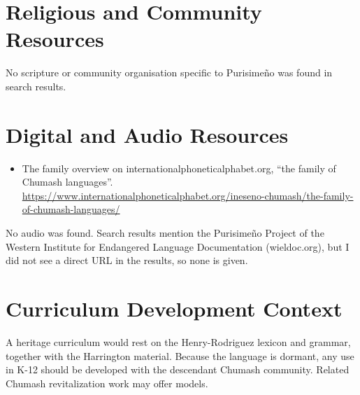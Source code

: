 \documentclass[12pt]{article}
\begin{document}
\section{Religious and Community Resources}
No scripture or community organisation specific to Purisime\~no was found in search results.

\section{Digital and Audio Resources}
\begin{itemize}
\item The family overview on internationalphoneticalphabet.org, ``the family of Chumash languages''. \url{https://www.internationalphoneticalphabet.org/ineseno-chumash/the-family-of-chumash-languages/}
\end{itemize}
No audio was found. Search results mention the Purisime\~no Project of the Western Institute for Endangered Language Documentation (wieldoc.org), but I did not see a direct URL in the results, so none is given.

\section{Curriculum Development Context}
A heritage curriculum would rest on the Henry-Rodriguez lexicon and grammar, together with the Harrington material. Because the language is dormant, any use in K-12 should be developed with the descendant Chumash community. Related Chumash revitalization work may offer models.
\end{document}

